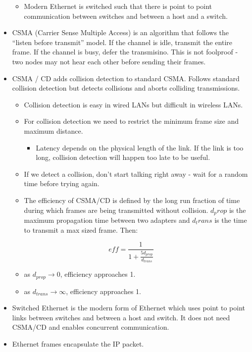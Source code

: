 \documentclass[]{article}
\providecommand{\tightlist}{%
  \setlength{\itemsep}{0pt}\setlength{\parskip}{0pt}}
\begin{document}
\begin{itemize}
  \begin{itemize}
  \tightlist
  \item
    Modern Ethernet is switched such that there is point to point
    communication between switches and between a host and a switch.
  \end{itemize}
\item
  CSMA (Carrier Sense Multiple Access) is an algorithm that follows the
  ``listen before transmit'' model. If the channel is idle, transmit the
  entire frame. If the channel is busy, defer the transmisino. This is
  not foolproof - two nodes may not hear each other before sending their
  frames.
\item
  CSMA / CD adds collision detection to standard CSMA. Follows standard
  collision detection but detects collisions and aborts colliding
  transmissions.

  \begin{itemize}
  \tightlist
  \item
    Collision detection is easy in wired LANs but difficult in wireless
    LANs.
  \item
    For collision detection we need to restrict the minimum frame size
    and maximum distance.

    \begin{itemize}
    \tightlist
    \item
      Latency depends on the physical length of the link. If the link is
      too long, collision detection will happen too late to be useful.
    \end{itemize}
  \item
    If we detect a collision, don't start talking right away - wait for
    a random time before trying again.
  \item
    The efficiency of CSMA/CD is defined by the long run fraction of
    time during which frames are being transmitted without collision.
    \(d_prop\) is the maximum propagation time between two adapters and
    \(d_trans\) is the time to transmit a max sized frame. Then:
  \end{itemize}

  \[eff = \frac{1}{1 + \frac{5 d_{prop}}{d_{trans}}}\]

  \begin{itemize}
  \tightlist
  \item
    as \(d_{prop} \to 0\), efficiency approaches 1.
  \item
    as \(d_{trans} \to \infty\), efficiency approaches 1.
  \end{itemize}
\item
  Switched Ethernet is the modern form of Ethernet which uses point to
  point links between switches and between a host and switch. It does
  not need CSMA/CD and enables concurrent communication.
\item
  Ethernet frames encapsulate the IP packet.


\end{itemize}
\end{document}
